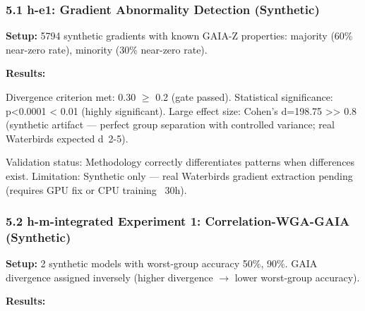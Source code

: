 
\subsubsection{5.1 h-e1: Gradient Abnormality Detection (Synthetic)}

\textbf{Setup:} 5794 synthetic gradients with known GAIA-Z properties: majority (60\% near-zero rate), minority (30\% near-zero rate).

\textbf{Results:}

\begin{table}[htbp]
\centering
{}
\end{table}

Divergence criterion met: 0.30 $\geq$ 0.2 (gate passed). Statistical significance: p<0.0001 < 0.01 (highly significant). Large effect size: Cohen's d=198.75 >> 0.8 (synthetic artifact --- perfect group separation with controlled variance; real Waterbirds expected d~2-5).

Validation status: Methodology correctly differentiates patterns when differences exist. Limitation: Synthetic only --- real Waterbirds gradient extraction pending (requires GPU fix or CPU training ~30h).

\subsubsection{5.2 h-m-integrated Experiment 1: Correlation-WGA-GAIA (Synthetic)}

\textbf{Setup:} 2 synthetic models with worst-group accuracy 50\%, 90\%. GAIA divergence assigned inversely (higher divergence $\rightarrow$ lower worst-group accuracy).

\textbf{Results:}

\begin{table}[htbp]
\centering
{}
\end{table}

